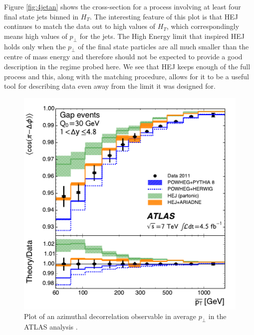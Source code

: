 Figure \ref{fig:4jetan} shows the cross-section for a process involving at least four final state jets binned in $H_T$. The interesting feature of this plot is that HEJ continues to match the data out to high values of $H_T$, which correspondingly means high values of $p_\perp$ for the jets. The High Energy limit that inspired HEJ holds only when the $p_\perp$ of the final state particles are all much smaller than the centre of mass energy and therefore should not be expected to provide a good description in the regime probed here. We see that HEJ keeps enough of the full process and this, along with the matching procedure, allows for it to be a useful tool for describing data even away from the limit it was designed for.

\begin{figure}[t]
\centering
\includegraphics[scale=0.8]{Images/hej_powheg_agree.pdf} 
\caption{Plot of an azimuthal decorrelation observable in average $p_\perp$ in the ATLAS analysis \cite{Aad2014}.}
\label{fig:vetoptbar}
\end{figure}


